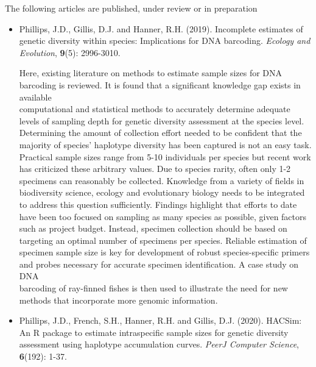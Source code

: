 The following articles are published, under review or in preparation

\begin{itemize}

\item Phillips, J.D., Gillis, D.J. and Hanner, R.H. (2019). Incomplete estimates of genetic diversity within species: Implications for DNA barcoding. \textit{Ecology and Evolution}, \textbf{9}(5): 2996-3010.

Here, existing literature on methods to estimate sample sizes for DNA barcoding is reviewed. It is found that a significant knowledge gap exists in available \\ computational and statistical methods to accurately determine adequate levels of sampling depth for genetic diversity assessment at the species level. Determining the amount of collection effort needed to be confident that the majority of species’ haplotype diversity has been captured is not an easy task. Practical sample sizes range from 5-10 individuals per species but recent work has criticized these arbitrary values. Due to species rarity, often only 1-2 specimens can reasonably be collected. Knowledge from a variety of fields in biodiversity science, ecology and evolutionary biology needs to be integrated to address this question sufficiently. Findings highlight that efforts to date have been too focused on sampling as many species as possible, given factors such as project budget. Instead, specimen collection should be based on targeting an optimal number of specimens per species. Reliable estimation of specimen sample size is key for development of robust species-specific primers and probes necessary for accurate specimen identification. A case study on DNA \\ barcoding of ray-finned fishes \cite{phillips2015exploration} is then used to illustrate the need for new \\ methods that incorporate more genomic information.

\vspace{1mm}

\item Phillips, J.D., French, S.H., Hanner, R.H. and Gillis, D.J. (2020). HACSim: An R package to estimate intraspecific sample sizes for genetic diversity assessment using haplotype accumulation curves. \textit{PeerJ Computer Science}, \textbf{6}(192): 1-37.


\end{itemize}
